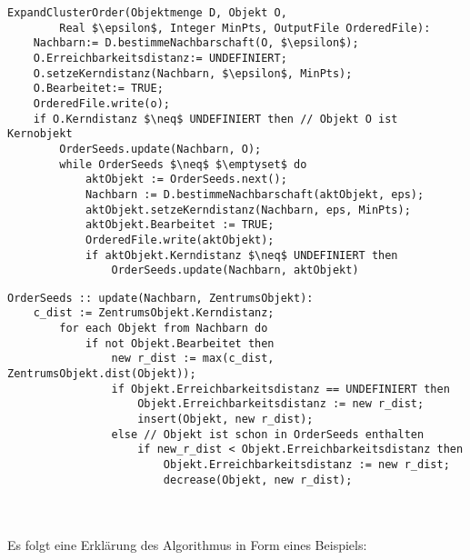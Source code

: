 \documentclass[11pt,ceqn]{book}
\begin{document}
\begin{minipage}{\linewidth}
\begin{lstlisting}[frame=single,mathescape=true]
ExpandClusterOrder(Objektmenge D, Objekt O, 
		Real $\epsilon$, Integer MinPts, OutputFile OrderedFile):
	Nachbarn:= D.bestimmeNachbarschaft(O, $\epsilon$);
	O.Erreichbarkeitsdistanz:= UNDEFINIERT;
	O.setzeKerndistanz(Nachbarn, $\epsilon$, MinPts);
	O.Bearbeitet:= TRUE;
	OrderedFile.write(o);
	if O.Kerndistanz $\neq$ UNDEFINIERT then // Objekt O ist Kernobjekt
		OrderSeeds.update(Nachbarn, O);
		while OrderSeeds $\neq$ $\emptyset$ do
			aktObjekt := OrderSeeds.next();
			Nachbarn := D.bestimmeNachbarschaft(aktObjekt, eps);
			aktObjekt.setzeKerndistanz(Nachbarn, eps, MinPts);
			aktObjekt.Bearbeitet := TRUE;
			OrderedFile.write(aktObjekt);
			if aktObjekt.Kerndistanz $\neq$ UNDEFINIERT then
				OrderSeeds.update(Nachbarn, aktObjekt)
\end{lstlisting}
\end{minipage}

\begin{minipage}{\linewidth}
\begin{lstlisting}[frame=single,mathescape=true]
OrderSeeds :: update(Nachbarn, ZentrumsObjekt):
	c_dist := ZentrumsObjekt.Kerndistanz;
		for each Objekt from Nachbarn do
			if not Objekt.Bearbeitet then
				new r_dist := max(c_dist, ZentrumsObjekt.dist(Objekt));
				if Objekt.Erreichbarkeitsdistanz == UNDEFINIERT then
					Objekt.Erreichbarkeitsdistanz := new r_dist;
					insert(Objekt, new r_dist);
				else // Objekt ist schon in OrderSeeds enthalten
					if new_r_dist < Objekt.Erreichbarkeitsdistanz then
						Objekt.Erreichbarkeitsdistanz := new r_dist;
						decrease(Objekt, new r_dist);
\end{lstlisting}
\end{minipage}
\\~\\
Es folgt eine Erklärung des Algorithmus in Form eines Beispiels:
\end{document}
